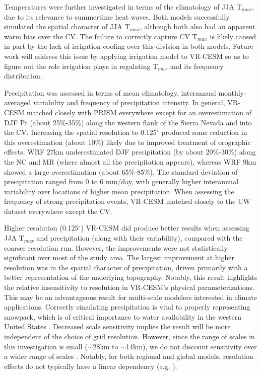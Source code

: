 \documentclass[ms,draft]{agutex}   %
\begin{document}
\begin{article}
Temperatures were further investigated in terms of the climatology of JJA T$_{max}$, due to its relevance to summertime heat waves.  Both models successfully simulated the spatial character of JJA T$_{max}$, although both also had an apparent warm bias over the CV.  The failure to correctly capture CV T$_{max}$ is likely caused in part by the lack of irrigation cooling over this division in both models. Future work will address this issue by applying irrigation model to VR-CESM so as to figure out the role irrigation plays in regulating T$_{max}$ and its frequency distribution.


Precipitation was assessed in terms of mean climatology, interannual monthly-averaged variability and frequency of precipitation intensity.  In general, VR-CESM matched closely with PRISM everywhere except for an  overestimation of DJF Pr (about 25$\%$-35$\%$) along the western flank of the Sierra Nevada and into the CV. Increasing the spatial resolution to 0.125$^\circ$ produced some reduction in this overestimation (about 10$\%$) likely due to improved treatment of orographic effects. WRF 27km underestimated DJF precipitation (by about 20$\%$-30$\%$) along the NC and MR (where almost all the precipitation appears), whereas WRF 9km showed a large overestimation (about 65$\%$-85$\%$). The standard deviation of precipitation ranged from 0 to 6 mm$/$day, with generally higher interannual variability over locations of higher mean precipitation. When assessing the frequency of strong precipitation events, VR-CESM matched closely to the UW dataset everywhere except the CV.

Higher resolution (0.125$^\circ$) VR-CESM did produce better results when assessing JJA T$_{max}$ and precipitation (along with their variability), compared with the coarser resolution run. However, the improvements were not statistically significant over most of the study area.  The largest improvement at higher resolution was in the spatial character of precipitation, driven primarily with a better representation of the underlying topography. Notably, this result highlights the relative insensitivity to resolution in VR-CESM's physical parameterizations. This may be an advantageous result for multi-scale modelers interested in climate applications. Correctly simulating precipitation is vital to properly representing snowpack, which is of critical importance to water availability in the western United States \citep{bales2006mountain, wise2012hydroclimatology, rhoades2015characterizing}. Decreased scale sensitivity implies the result will be more independent of the choice of grid resolution. However, since the range of scales in this investigation is small ($\sim$28km to $\sim$14km), we do not discount sensitivity over a wider range of scales \citep{wehner2010effect, rauscher2010resolution}. Notably, for both regional and global models, resolution effects do not typically have a linear dependency (e.g. \cite{hughes2014landfall, wehner2014effect}).


\end{article}
\end{document}
